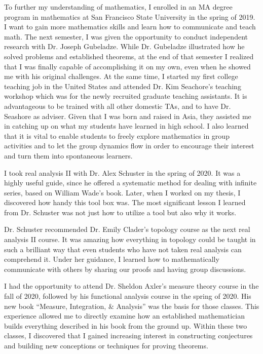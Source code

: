 \documentclass[10pt]{amsart}
\begin{document}
To further my understanding of mathematics, I enrolled in an MA degree program in mathematics at San Francisco State University in the spring of 2019. I want to gain more mathematics skills and learn how to communicate and teach math. The next semester, I was given the opportunity to conduct independent research with Dr. Joseph Gubeladze. While Dr. Gubeladze illustrated how he solved problems and established theorems, at the end of that semester I realized that I was finally capable of accomplishing it on my own, even when he showed me with his original challenges. At the same time, I started my first college teaching job in the United States and attended Dr. Kim Seachore's teaching workshop which was for the newly recruited graduate teaching assistants. It is advantageous to be trained with all other domestic TAs, and to have Dr. Seashore as adviser. Given that I was born and raised in Asia, they assisted me in catching up on what my students have learned in high school. I also learned that it is vital to enable students to freely explore mathematics in group activities and to let the group dynamics flow in order to encourage their interest and turn them into spontaneous learners.


I took real analysis II with Dr. Alex Schuster in the spring of 2020. It was a highly useful guide, since he offered a systematic method for dealing with infinite series, based on William Wade's book. Later, when I worked on my thesis, I discovered how handy this tool box was. The most significant lesson I learned from Dr. Schuster was not just how to utilize a tool but also why it works.

Dr. Schuster recommended Dr. Emily Clader's topology course as the next real analysis II course. It was amazing how everything in topology could be taught in such a brilliant way that even students who have not taken real analysis can comprehend it. Under her guidance, I learned how to mathematically communicate with others by sharing our proofs and having group discussions. 

I had the opportunity to attend Dr. Sheldon Axler's measure theory course in the fall of 2020,
followed by his functional analysis course in the spring of 2020. His new book ``Measure, Integration, $\&$ Analysis'' was the basis for those classes. This experience allowed me to directly examine how an established mathematician builds everything described in his book from the ground up. Within these two classes, I discovered that I gained increasing interest in constructing conjectures and building new conceptions or techniques for proving theorems.
\end{document}
